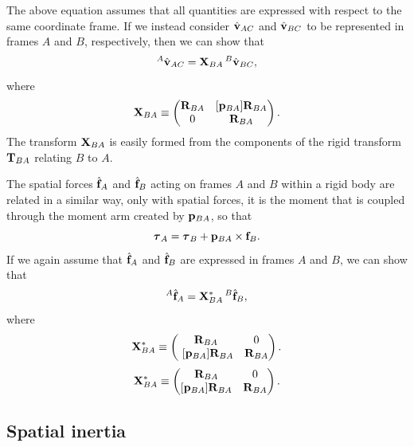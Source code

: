 The above equation assumes that all quantities are expressed
with respect to the same coordinate frame.
If we instead consider $\hat{{\bf v}}_{AC}$ and $\hat{{\bf v}}_{BC}$ to be represented
in frames $A$ and $B$, respectively, then
we can show that
%
\begin{equation}
{}^A\hat{{\bf v}}_{AC} = {\bf X}_{BA} \, {}^B\hat{{\bf v}}_{BC},
\end{equation}
%
where
%
\begin{equation}
{\bf X}_{BA} \equiv
\left(\begin{matrix} {\bf R}_{BA} & [{\bf p}_{BA}] {\bf R}_{BA} \\ 0 & {\bf R}_{BA} \end{matrix}\right).
\label{XvelAB:eqn}
\end{equation}
%
The transform ${\bf X}_{BA}$ is easily formed from the components of the
rigid transform ${\bf T}_{BA}$ relating $B$ to $A$.

The spatial forces $\hat{{\bf f}}_A$ and $\hat{{\bf f}}_B$ acting on frames $A$ and
$B$ within a rigid body are related in a similar way, only with
spatial forces, it is the moment that is coupled through the moment
arm created by ${\bf p}_{BA}$, so that
%
\begin{equation*}
\boldsymbol\tau_{A} = \boldsymbol\tau_{B} + {\bf p}_{BA} \times {\bf f}_{B}.
\end{equation*}
%
If we again assume that $\hat{{\bf f}}_A$ and $\hat{{\bf f}}_B$
are expressed in frames $A$ and $B$, we can show that
%
\begin{equation}
{}^A\hat{{\bf f}}_A = {\bf X}^*_{BA} \, {}^B\hat{{\bf f}}_B,
\end{equation}
%
where
%
\iflatexml
\begin{equation}
{\bf X}^*_{BA} \equiv 
\left(\begin{matrix} {\bf R}_{BA} & 0 \\  ~[{\bf p}_{BA}]{\bf R}_{BA} & {\bf R}_{BA} \end{matrix}\right). 
\label{XforceAB:eqn}
\end{equation}
\else
\begin{equation}
\X^*_{BA} \equiv
\matl \R_{BA} & 0 \\  [\p_{BA}] \R_{BA} & \R_{BA} \matr.
\label{XforceAB:eqn}
\end{equation}
\fi


\subsection{Spatial inertia}
\label{SpatialInertia:sec}

